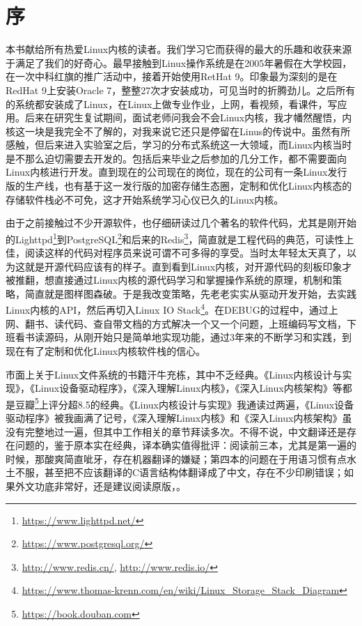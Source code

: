 \chapter{序}

本书献给所有热爱Linux内核的读者。我们学习它而获得的最大的乐趣和收获来源于满足了我们的好奇心。最早接触到Linux操作系统是在2005年暑假在大学校园，在一次中科红旗的推广活动中，接着开始使用RetHat 9。印象最为深刻的是在RedHat 9上安装Oracle 7，整整27次才安装成功，可见当时的折腾劲儿。之后所有的系统都安装成了Linux，在Linux上做专业作业，上网，看视频，看课件，写应用。后来在研究生复试期间，面试老师问我会不会Linux内核，我才幡然醒悟，内核这一块是我完全不了解的，对我来说它还只是停留在Linus的传说中。虽然有所感触，但后来进入实验室之后，学习的分布式系统这一大领域，而Linux内核当时是不那么迫切需要去开发的。包括后来毕业之后参加的几分工作，都不需要面向Linux内核进行开发。直到现在的公司现在的岗位，现在的公司有一条Linux发行版的生产线，也有基于这一发行版的加密存储生态圈，定制和优化Linux内核态的存储软件栈必不可免，这才开始系统学习心仪已久的Linux内核。

由于之前接触过不少开源软件，也仔细研读过几个著名的软件代码，尤其是刚开始的Lighttpd\footnote{\url{https://www.lighttpd.net/}}到PostgreSQL\footnote{\url{https://www.postgresql.org/}}和后来的Redis\footnote{\url{http://www.redis.cn/}, \url{http://www.redis.io/}}，简直就是工程代码的典范，可读性上佳，阅读这样的代码对程序员来说可谓不可多得的享受。当时太年轻太天真了，以为这就是开源代码应该有的样子。直到看到Linux内核，对开源代码的刻板印象才被推翻，想直接通过Linux内核的源代码学习和掌握操作系统的原理，机制和策略，简直就是图样图森破。于是我改变策略，先老老实实从驱动开发开始，去实践Linux内核的API，然后再切入Linux IO Stack\footnote{\url{https://www.thomas-krenn.com/en/wiki/Linux_Storage_Stack_Diagram}}。在DEBUG的过程中，通过上网、翻书、读代码、查自带文档的方式解决一个又一个问题，上班编码写文档，下班看书读源码，从刚开始只是简单地实现功能，通过3年来的不断学习和实践，到现在有了定制和优化Linux内核软件栈的信心。

市面上关于Linux文件系统的书籍汗牛充栋，其中不乏经典。《Linux内核设计与实现》，《Linux设备驱动程序》，《深入理解Linux内核》，《深入Linux内核架构》等都是豆瓣\footnote{\url{https://book.douban.com}}上评分超8.5的经典。《Linux内核设计与实现》我通读过两遍，《Linux设备驱动程序》被我画满了记号，《深入理解Linux内核》和《深入Linux内核架构》虽没有完整地过一遍，但其中工作相关的章节拜读多次。不得不说，中文翻译还是存在问题的，鉴于原本实在经典，译本确实值得批评：阅读前三本，尤其是第一遍的时候，那酸爽简直呲牙，存在机器翻译的嫌疑；第四本的问题在于用语习惯有点水土不服，甚至把不应该翻译的C语言结构体翻译成了中文，存在不少印刷错误；如果外文功底非常好，还是建议阅读原版，。

